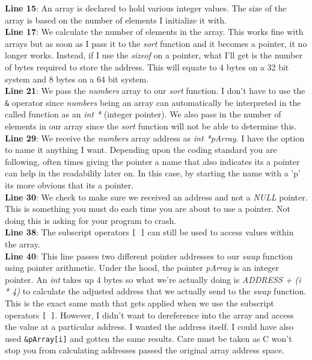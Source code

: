 \documentclass[../main.tex]{subfiles}
\begin{document}
	\textbf{Line 15}: An array is declared to hold various integer values. The size of the array is based on the number of elements I initialize it with.\\
	\textbf{Line 17}: We calculate the number of elements in the array.  This works fine with arrays but as soon as I pass it to the \textit{sort} function and it becomes a pointer, it no longer works\cite{embedded_c}.  Instead, if I use the \textit{sizeof} on a pointer, what I'll get is the number of bytes required to store the address.  This will equate to 4 bytes on a 32 bit system and 8 bytes on a 64 bit system.\\
	\textbf{Line 21}: We pass the \textit{numbers} array to our \textit{sort} function.  I don't have to use the \texttt{\&} operator since \textit{numbers} being an array can automatically be interpreted in the called function as an \textit{int *} (integer pointer).  We also pass in the number of elements in our array since the \textit{sort} function will not be able to determine this.\\
	\textbf{Line 29}: We receive the \textit{numbers} array address as \textit{int *pArray}.  I have the option to name it anything I want.  Depending upon the coding standard you are following, often times giving the pointer a name that also indicates its a pointer can help in the readabilily later on\cite{embedded_c}. In this case, by starting the name with a 'p' its more obvious that its a pointer.\\
	\textbf{Line 30}: We check to make sure we received an address and not a \textit{NULL} pointer. This is something you must do each time you are about to use a pointer.  Not doing this is asking for your program to crash.\\
	\textbf{Line 38}: The subscript operators \texttt{[ ]} can still be used to access values within the array.\\
	\textbf{Line 40}: This line passes two different pointer addresses to our \textit{swap} function using pointer arithmetic.  Under the hood, the pointer \textit{pArray} is an integer pointer.  An \textit{int} takes up 4 bytes so what we're actually doing is \textit{ADDRESS + (i * 4)} to calculate the adjusted address that we actually send to the \textit{swap} function.  This is the exact same math that gets applied when we use the subscript operators \texttt{[ ]}.  However, I didn't want to dereference into the array and access the value at a particular address.  I wanted the address itself.  I could have also used \texttt{\&pArray[i]} and gotten the same results. Care must be taken as C won't stop you from calculating addresses passed the original array address space.\\
\end{document}
